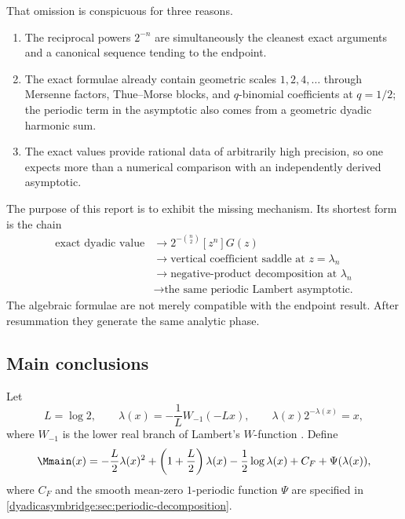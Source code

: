 \documentclass[11pt,oneside]{article}
\theoremstyle{definition}
\theoremstyle{remark}
\begin{document}
That omission is conspicuous for three reasons.

\begin{enumerate}
\item The reciprocal powers $2^{-n}$ are simultaneously the cleanest exact arguments and a canonical sequence tending to the endpoint.
\item The exact formulae already contain geometric scales $1,2,4,\ldots$ through Mersenne factors, Thue--Morse blocks, and $q$-binomial coefficients at $q=1/2$; the periodic term in the asymptotic also comes from a geometric dyadic harmonic sum.
\item The exact values provide rational data of arbitrarily high precision, so one expects more than a numerical comparison with an independently derived asymptotic.
\end{enumerate}

The purpose of this report is to exhibit the missing mechanism.  Its shortest form is the chain
\begin{equation}
\boxed{
\begin{aligned}
\text{exact dyadic value}
&\longrightarrow 2^{-\binom n2}[z^n]G(z)\\
&\longrightarrow \text{vertical coefficient saddle at }z=\lambda_n\\
&\longrightarrow \text{negative-product decomposition at }\lambda_n\\
&\longrightarrow \text{the same periodic Lambert asymptotic.}
\end{aligned}}
\label{dyadicasymbridge:eq:bridge-chain}
\end{equation}
The algebraic formulae are not merely compatible with the endpoint result.  After resummation they generate the same analytic phase.

\subsection{Main conclusions}

Let
\begin{equation}
 L=\log2,
 \qquad
 \lambda(x)=-\frac1L W_{-1}(-Lx),
 \qquad
 \lambda(x)2^{-\lambda(x)}=x,
\label{dyadicasymbridge:eq:lambda-def}
\end{equation}
where $W_{-1}$ is the lower real branch of Lambert's $W$-function \cite{dyadicasymbridge:corless1996}.  Define
\begin{equation}
 \Mmain(x)=
 -\frac L2\lambda(x)^2+
 \left(1+\frac L2\right)\lambda(x)
 -\frac12\log\lambda(x)+C_F+\Psi(\lambda(x)),
\label{dyadicasymbridge:eq:main-M}
\end{equation}
where $C_F$ and the smooth mean-zero $1$-periodic function $\Psi$ are specified in
\cref{dyadicasymbridge:sec:periodic-decomposition}.
\end{document}
